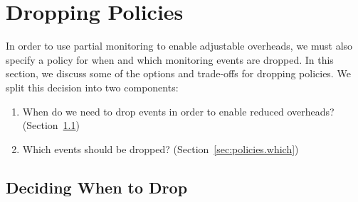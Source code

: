 \section{Dropping Policies} \label{sec:policies}

In order to use partial monitoring to enable adjustable overheads, we must also
specify a policy for when and which monitoring events are dropped. In this
section, we discuss some of the options and trade-offs for dropping policies.
We split this decision into two components: \begin{enumerate} \item When do we
need to drop events in order to enable reduced overheads?
(Section~\ref{sec:policies.when}) \item Which events should be dropped?
(Section~\ref{sec:policies.which}) \end{enumerate}


\subsection{Deciding When to Drop} \label{sec:policies.when}

